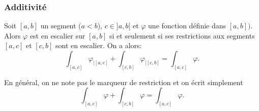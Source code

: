  \subsubsection{Additivité}
 \begin{propn}\label{prop:chasles0}
  Soit $[a,b]$ un segment ($a<b$), $c \in ]a,b[$ et $\varphi$ une fonction définie dans $[a,b])$. Alors $\varphi$ est en escalier sur $[a,b]$ si et seulement si ses restrictions aux segments $[a,c]$ et $[c,b]$ sont en escalier.  On a alors:
  \[
   \int_{[a,c]}\varphi_{|[a,c]} + \int_{[c,b]}\varphi_{|[c,b]} = \int_{[a,c]}\varphi.
  \]
 \end{propn}
\begin{rem}
 En général, on ne note pas le marqueur de restriction et on écrit simplement
  \[
   \int_{[a,c]}\varphi + \int_{[c,b]}\varphi = \int_{[a,c]}\varphi.
  \]
\end{rem}

